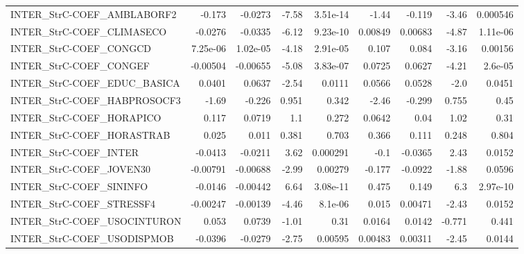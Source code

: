 \begin{tabular}{lrrrrrrrr}
INTER\_StrC-COEF\_AMBLABORF2             &      -0.173 &      -0.0273 &   -7.58 & 3.51e-14 &      -1.44 &      -0.119 &        -3.46 &      0.000546 \\
INTER\_StrC-COEF\_CLIMASECO              &     -0.0276 &      -0.0335 &   -6.12 & 9.23e-10 &    0.00849 &     0.00683 &        -4.87 &      1.11e-06 \\
INTER\_StrC-COEF\_CONGCD                 &    7.25e-06 &     1.02e-05 &   -4.18 & 2.91e-05 &      0.107 &       0.084 &        -3.16 &       0.00156 \\
INTER\_StrC-COEF\_CONGEF                 &    -0.00504 &     -0.00655 &   -5.08 & 3.83e-07 &     0.0725 &      0.0627 &        -4.21 &       2.6e-05 \\
INTER\_StrC-COEF\_EDUC\_BASICA            &      0.0401 &       0.0637 &   -2.54 &   0.0111 &     0.0566 &      0.0528 &         -2.0 &        0.0451 \\
INTER\_StrC-COEF\_HABPROSOCF3            &       -1.69 &       -0.226 &   0.951 &    0.342 &      -2.46 &      -0.299 &        0.755 &          0.45 \\
INTER\_StrC-COEF\_HORAPICO               &       0.117 &       0.0719 &     1.1 &    0.272 &     0.0642 &        0.04 &         1.02 &          0.31 \\
INTER\_StrC-COEF\_HORASTRAB              &       0.025 &        0.011 &   0.381 &    0.703 &      0.366 &       0.111 &        0.248 &         0.804 \\
INTER\_StrC-COEF\_INTER                  &     -0.0413 &      -0.0211 &    3.62 & 0.000291 &       -0.1 &     -0.0365 &         2.43 &        0.0152 \\
INTER\_StrC-COEF\_JOVEN30                &    -0.00791 &     -0.00688 &   -2.99 &  0.00279 &     -0.177 &     -0.0922 &        -1.88 &        0.0596 \\
INTER\_StrC-COEF\_SININFO                &     -0.0146 &     -0.00442 &    6.64 & 3.08e-11 &      0.475 &       0.149 &          6.3 &      2.97e-10 \\
INTER\_StrC-COEF\_STRESSF4               &    -0.00247 &     -0.00139 &   -4.46 &  8.1e-06 &      0.015 &     0.00471 &        -2.43 &        0.0152 \\
INTER\_StrC-COEF\_USOCINTURON            &       0.053 &       0.0739 &   -1.01 &     0.31 &     0.0164 &      0.0142 &       -0.771 &         0.441 \\
INTER\_StrC-COEF\_USODISPMOB             &     -0.0396 &      -0.0279 &   -2.75 &  0.00595 &    0.00483 &     0.00311 &        -2.45 &        0.0144 \\

\end{tabular}
